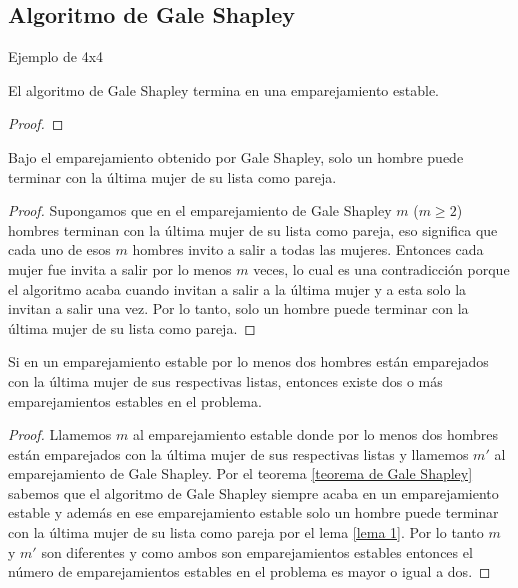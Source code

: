 \subsection{Algoritmo de Gale Shapley}
\begin{eje}
Ejemplo de 4x4
\end{eje}

\begin{teo}
\label{teorema de Gale Shapley}
El algoritmo de Gale Shapley termina en una emparejamiento estable.
\end{teo}
\begin{proof}

\end{proof}

\begin{lem}
\label{lema 1}
Bajo el emparejamiento obtenido por Gale Shapley, solo un hombre puede terminar con la última mujer de su lista como pareja. 
\end{lem}

\begin{proof}
Supongamos que en el emparejamiento de Gale Shapley $m$ ($m\geq2$) hombres terminan con la última mujer de su lista como pareja, eso significa que cada uno de esos $m$ hombres invito a salir a todas las mujeres. Entonces cada mujer fue invita a salir por lo menos $m$ veces, lo cual es una contradicción porque el algoritmo acaba cuando invitan a salir a la última mujer y a esta solo la invitan a salir una vez. Por lo tanto, solo un hombre puede terminar con la última mujer de su lista como pareja. 
\end{proof}

\begin{cor}
Si en un emparejamiento estable por lo menos dos hombres están emparejados con la última mujer de sus respectivas listas, entonces existe dos o más emparejamientos estables en el problema.
\end{cor}

\begin{proof}
Llamemos $m$ al emparejamiento estable donde por lo menos dos hombres están emparejados con la última mujer de sus respectivas listas y llamemos $m'$ al emparejamiento de Gale Shapley.
Por el teorema \ref{teorema de Gale Shapley} sabemos que el algoritmo de Gale Shapley siempre acaba en un emparejamiento estable y además en ese emparejamiento estable solo un hombre puede terminar con la última mujer de su lista como pareja por el lema \ref{lema 1}.
Por lo tanto $m$ y $m'$ son diferentes y como ambos son emparejamientos estables entonces el número de emparejamientos estables en el problema es mayor o igual a dos. 
\end{proof}

